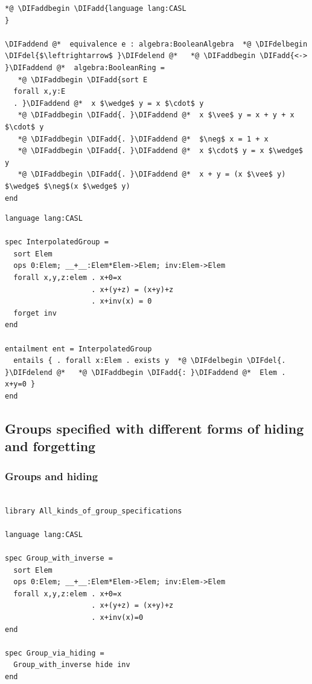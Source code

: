 \documentclass[10pt,fleqn,final]{scrreprt}
\newcommand{\ssclause}[1]{\subsection{#1}}
\newcommand{\sssclause}[1]{\subsubsection{#1}}
\providecommand{\DIFadd}[1]{{\protect\color{blue}\uwave{#1}}} %
\providecommand{\DIFdel}[1]{{\protect\color{red}\sout{#1}}}                      %
\providecommand{\DIFaddbegin}{} %
\providecommand{\DIFaddend}{} %
\providecommand{\DIFdelbegin}{} %
\providecommand{\DIFdelend}{} %
\begin{document}
 \begin{lstlisting}[basicstyle=\ttfamily,language=dolText,alsolanguage=clif,escapechar=@,mathescape]
*@ \DIFaddbegin \DIFadd{language lang:CASL
}

\DIFaddend @*  equivalence e : algebra:BooleanAlgebra  *@ \DIFdelbegin \DIFdel{$\leftrightarrow$ }\DIFdelend @*   *@ \DIFaddbegin \DIFadd{<-> }\DIFaddend @*  algebra:BooleanRing =
   *@ \DIFaddbegin \DIFadd{sort E
  forall x,y:E
  . }\DIFaddend @*  x $\wedge$ y = x $\cdot$ y
   *@ \DIFaddbegin \DIFadd{. }\DIFaddend @*  x $\vee$ y = x + y + x $\cdot$ y
   *@ \DIFaddbegin \DIFadd{. }\DIFaddend @*  $\neg$ x = 1 + x
   *@ \DIFaddbegin \DIFadd{. }\DIFaddend @*  x $\cdot$ y = x $\wedge$ y
   *@ \DIFaddbegin \DIFadd{. }\DIFaddend @*  x + y = (x $\vee$ y) $\wedge$ $\neg$(x $\wedge$ y)
end
\end{lstlisting}

\begin{lstlisting}[basicstyle=\ttfamily,language=dolText,alsolanguage=CASL,escapechar=@,mathescape]
language lang:CASL

spec InterpolatedGroup =
  sort Elem
  ops 0:Elem; __+__:Elem*Elem->Elem; inv:Elem->Elem
  forall x,y,z:elem . x+0=x
                    . x+(y+z) = (x+y)+z
                    . x+inv(x) = 0
  forget inv
end

entailment ent = InterpolatedGroup
  entails { . forall x:Elem . exists y  *@ \DIFdelbegin \DIFdel{. }\DIFdelend @*   *@ \DIFaddbegin \DIFadd{: }\DIFaddend @*  Elem . x+y=0 }
end
\end{lstlisting}

\ssclause{Groups specified with different forms of hiding and forgetting}

\sssclause{Groups and hiding}
\begin{lstlisting}[basicstyle=\ttfamily,language=dolText,alsolanguage=CASL,escapechar=@,mathescape]
%prefix( lang: <http://purl.net/DOL/languages/> )%

library All_kinds_of_group_specifications

language lang:CASL

spec Group_with_inverse =
  sort Elem
  ops 0:Elem; __+__:Elem*Elem->Elem; inv:Elem->Elem
  forall x,y,z:elem . x+0=x
                    . x+(y+z) = (x+y)+z
                    . x+inv(x)=0
end

spec Group_via_hiding =
  Group_with_inverse hide inv
end
\end{lstlisting}
\end{document}
